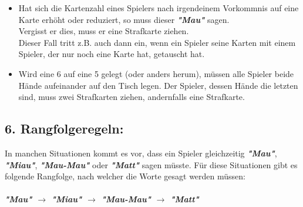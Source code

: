 \documentclass{article}
\begin{document}
\begin{itemize}
         
\item Hat sich die Kartenzahl eines Spielers nach irgendeinem Vorkommnis auf eine Karte erhöht oder reduziert, so muss dieser \textit{\textbf{"Mau"}} sagen. \\ Vergisst er dies, muss er eine Strafkarte ziehen. \\ Dieser Fall tritt z.B. auch dann ein, wenn ein Spieler seine Karten mit einem Spieler, der nur noch eine Karte hat, getauscht hat.

\item Wird eine 6 auf eine 5 gelegt (oder anders herum), müssen alle Spieler beide Hände aufeinander auf den Tisch legen. Der Spieler, dessen Hände die letzten sind, muss zwei Strafkarten ziehen, andernfalls eine Strafkarte.

\end{itemize}

\subsection*{6. Rangfolgeregeln:}

In manchen Situationen kommt es vor, dass ein Spieler gleichzeitig \textit{\textbf{"Mau"}}, \textit{\textbf{"Miau"}}, \textit{\textbf{"Mau-Mau"}} oder \textit{\textbf{"Matt"}} sagen müsste. Für diese Situationen gibt es folgende Rangfolge, nach welcher die Worte gesagt werden müssen: \\ \\ \textit{\textbf{"Mau" $\rightarrow$ "Miau" $\rightarrow$ "Mau-Mau" $\rightarrow$ "Matt"}}
          
\end{document}
